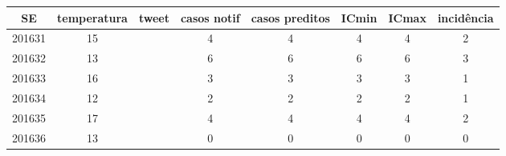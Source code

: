 \begin{tabular}{c|ccccccc}
  \hline
SE & temperatura & tweet & casos notif & casos preditos & ICmin & ICmax & incidência \\ 
  \hline
201631 & 15 &  & 4 & 4 & 4 & 4 & 2 \\ 
  201632 & 13 &  & 6 & 6 & 6 & 6 & 3 \\ 
  201633 & 16 &  & 3 & 3 & 3 & 3 & 1 \\ 
  201634 & 12 &  & 2 & 2 & 2 & 2 & 1 \\ 
  201635 & 17 &  & 4 & 4 & 4 & 4 & 2 \\ 
  201636 & 13 &  & 0 & 0 & 0 & 0 & 0 \\ 
   \hline
\end{tabular}
